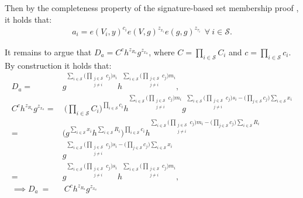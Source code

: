 Then by the completeness property of the signature-based set membership proof \cite{RANGE-SET}, it holds that:
\begin{align*}
a_i = e(V_i,y)^{c_i}e(V,g)^{z_{x_i}}e(g,g)^{z_{\tau_i}} \:\: \forall \: i\in\mathcal{S}.
\end{align*}

It remains to argue that $D_a =C^ch^{z_{R_a}}g^{z_{x_a}}$, where $C=\prod_{i\in\mathcal{S}}C_i$ and $c=\prod_{i\in\mathcal{S}}c_i$. By construction it holds that:
\begin{align*}
D_a = &g ^ {\sum_{i\in\mathcal{S}} \Big(\prod_{\substack{j\in\mathcal{S}\\ j\neq i}}   c_j \Big)s_i} h^ {\sum_{i\in\mathcal{S}} \Big(\prod_{\substack{j\in\mathcal{S}\\ j\neq i}}    c_j \Big)m_i}  ,
\\
 C^ch^{z_{R_a}}g^{z_{x_a}} =&\:  \Big( \prod_{i\in\mathcal{S}} C_i \Big)^{\prod_{i\in\mathcal{S}} c_i}h^ {\sum_{i\in\mathcal{S}} \Big( \prod_{\substack{j\in\mathcal{S}\\ j\neq i}}   c_j \Big)m_i}
g^{ \sum_{i\in\mathcal{S}} \Big( \prod_{\substack{j\in\mathcal{S}\\ j\neq i}}   c_j \Big)s_i - \big( \prod_{j\in\mathcal{S}} c_j \big) \sum_{i\in\mathcal{S}} x_i}
\\ 
 = &\Big( g^{\sum_{i\in\mathcal{S}} x_i} h^{\sum_{i\in\mathcal{S}} R_i}\Big)^{\prod_{i\in\mathcal{S}} c_i} h^{ \sum_{i\in\mathcal{S}} \Big( \prod_{\substack{j\in\mathcal{S}\\ j\neq i}} c_j \Big)m_i - \big( \prod_{j\in\mathcal{S}} c_j \Big) \sum_{i\in\mathcal{S}} R_i  }
 \\
 &g^{ \sum_{i\in\mathcal{S}} \Big( \prod_{\substack{j\in\mathcal{S}\\ j\neq i}}   c_j \Big)s_i - \big( \prod_{j\in\mathcal{S}} c_j \big) \sum_{i\in\mathcal{S}} x_i} \\
 =  &g^{ \sum_{i\in\mathcal{S}} \Big( \prod_{\substack{j\in\mathcal{S}\\ j\neq i}}  c_j \Big)s_i } h^{\sum_{i\in\mathcal{S}} \Big( \prod_{\substack{j\in\mathcal{S}\\ j\neq i}}   c_j \Big)m_i}  ,
\\
 \implies D_a \:=& \:C^ch^{z_{R_a}}g^{z_{x_a}}
\end{align*}

